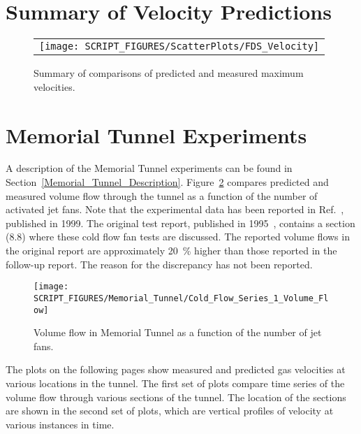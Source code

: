 \clearpage

\section{Summary of Velocity Predictions}
\label{Velocity}

\begin{figure}[h!]
\begin{center}
\begin{tabular}{l}
\texttt{[image: SCRIPT\_FIGURES/ScatterPlots/FDS\_Velocity]}
\end{tabular}
\end{center}
\caption[Summary of velocity predictions]
{Summary of comparisons of predicted and measured maximum velocities.}
\label{Steckler_Scatterplot}
\end{figure}

\clearpage

\section{Memorial Tunnel Experiments}
\label{Memorial_Tunnel_Velocity_Profiles}

A description of the Memorial Tunnel experiments can be found in Section~\ref{Memorial_Tunnel_Description}. Figure~\ref{Memorial_Tunnel_Cold_Flow} compares predicted and measured volume flow through the tunnel as a function of the number of activated jet fans. Note that the experimental data has been reported in Ref.~\cite{Memorial_Phase_IV}, published in 1999. The original test report, published in 1995~\cite{Memorial}, contains a section (8.8) where these cold flow fan tests are discussed. The reported volume flows in the original report are approximately 20~\% higher than those reported in the follow-up report. The reason for the discrepancy has not been reported.

\begin{figure}[h!]
\begin{center}
\texttt{[image: SCRIPT\_FIGURES/Memorial\_Tunnel/Cold\_Flow\_Series\_1\_Volume\_Flow]}
\end{center}
\caption[Volume flow in Memorial Tunnel as a function of the number of jet fans]
{Volume flow in Memorial Tunnel as a function of the number of jet fans.}
\label{Memorial_Tunnel_Cold_Flow}
\end{figure}

The plots on the following pages show measured and predicted gas velocities at various locations in the tunnel. The first set of plots compare time series of the volume flow through various sections of the tunnel. The location of the sections are shown in the second set of plots, which are vertical profiles of velocity at various instances in time.

